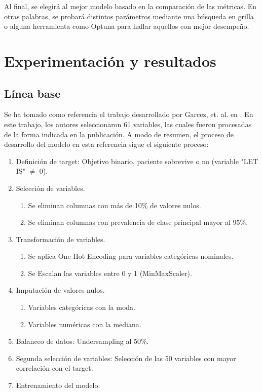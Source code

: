 \documentclass[conference]{IEEEtran}
\begin{document}
Al final, se elegirá al mejor modelo  basado en la comparación de las métricas. En otras palabras, se probará distintos parámetros mediante una búsqueda en grilla o alguna herramienta como Optuna \cite{bopt} para hallar aquellos con mejor desempeño.

\section{\textbf{Experimentación y resultados}}
\subsection{\textbf{Línea base}}
Se ha tomado como referencia el trabajo desarrollado por Garcez, et. al. en \cite{bref}. En este trabajo, los autores seleccionaron 61 variables, las cuales fueron procesadas de la forma indicada en la publicación. A modo de resumen, el proceso de desarrollo del modelo en esta referencia sigue el siguiente proceso:

\begin{enumerate}
    \item Definición de target: Objetivo binario, paciente sobrevive o no (variable "LET IS" $\neq$ 0).
    \item Selección de variables.
    \begin{enumerate}
        \item Se eliminan columnas con más de 10\% de valores nulos.
        \item Se eliminan columnas con prevalencia de clase principal mayor al 95\%.
    \end{enumerate}
    \item Transformación de variables.
    \begin{enumerate}
        \item Se aplica One Hot Encoding para variables categóricas nominales.
        \item Se Escalan las variables entre 0 y 1 (MinMaxScaler).
    \end{enumerate}
    \item Imputación de valores nulos.
    \begin{enumerate}
        \item Variables categóricas con la moda.
        \item Variables numéricas con la mediana.
    \end{enumerate}
    \item Balanceo de datos: Undersampling al 50\%.
    \item Segunda selección de variables: Selección de las 50 variables con mayor correlación con el target.
    \item Entrenamiento del modelo.
\end{enumerate}
\end{document}
